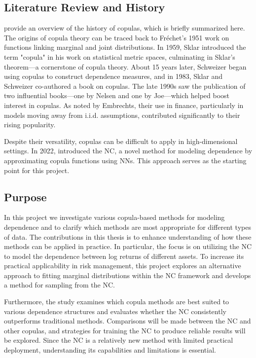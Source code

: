 \subsection{Literature Review and History}\label{LiteratureReview}
 provide an overview of the history of copulas, which is briefly summarized here. The origins of copula theory can be traced back to Fréchet’s 1951 work on functions linking marginal and joint distributions. In 1959, Sklar introduced the term "copula" in his work on statistical metric spaces, culminating in Sklar’s theorem—a cornerstone of copula theory. About 15 years later, Schweizer began using copulas to construct dependence measures, and in 1983, Sklar and Schweizer co-authored a book on copulas. The late 1990s saw the publication of two influential books—one by Nelsen and one by Joe—which helped boost interest in copulas. As noted by Embrechts, their use in finance, particularly in models moving away from i.i.d. assumptions, contributed significantly to their rising popularity.

Despite their versatility, copulas can be difficult to apply in high-dimensional settings. In 2022,  introduced the \gls{NC}, a novel method for modeling dependence by approximating copula functions using \gls{NN}s. This approach serves as the starting point for this project.

\subsection{Purpose}\label{Purpose}
In this project we investigate various copula-based methods for modeling dependence and to clarify which methods are most appropriate for different types of data. The contributions in this thesis is to enhance understanding of how these methods can be applied in practice. In particular, the focus is on utilizing the \gls{NC} to model the dependence between log returns of different assets. To increase its practical applicability in risk management, this project explores an alternative approach to fitting marginal distributions within the \gls{NC} framework and develops a method for sampling from the \gls{NC}. 

Furthermore, the study examines which copula methods are best suited to various dependence structures and evaluates whether the \gls{NC} consistently outperforms traditional methods. Comparisons will be made between the \gls{NC} and other copulas, and strategies for training the \gls{NC} to produce reliable results will be explored. Since the \gls{NC} is a relatively new method with limited practical deployment, understanding its capabilities and limitations is essential.

